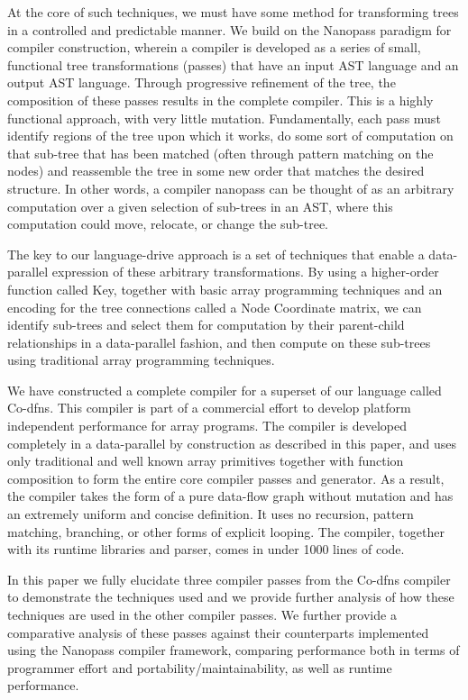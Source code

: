 \documentclass[pldi]{sigplanconf-pldi15}
\begin{document}
At the core of such techniques, we must have some method for transforming trees in a controlled and 
predictable manner. We build on the Nanopass paradigm for compiler construction, wherein a compiler is 
developed as a series of small, functional tree transformations (passes) that have an input AST language 
and an output AST language. Through progressive refinement of the tree, the composition of these 
passes results in the complete compiler. This is a highly functional approach, with very little mutation. 
Fundamentally, each pass must identify regions of the tree upon which it works, do some sort of computation 
on that sub-tree that has been matched (often through pattern matching on the nodes) and reassemble 
the tree in some new order that matches the desired structure. In other words, a compiler nanopass 
can be thought of as an arbitrary computation over a given selection of sub-trees in an AST, where 
this computation could move, relocate, or change the sub-tree. 

The key to our language-drive approach is a set of techniques that enable a data-parallel expression of 
these arbitrary transformations. By using a higher-order function called Key, together with basic array 
programming techniques and an encoding for the tree connections called a Node Coordinate matrix, we can 
identify sub-trees and select them for computation by their parent-child relationships in a data-parallel 
fashion, and then compute on these sub-trees using traditional array programming techniques. 

We have constructed a complete compiler for a superset of our language called Co-dfns. This compiler is 
part of a commercial effort to develop platform independent performance for array programs. The 
compiler is developed completely in a data-parallel by construction as described in this paper, and uses 
only traditional and well known array primitives together with function composition to form the entire 
core compiler passes and generator. As a result, the compiler takes the form of a pure data-flow graph 
without mutation and has an extremely uniform and concise definition. It uses no recursion, pattern 
matching, branching, or other forms of explicit looping. The compiler, together with its runtime libraries 
and parser, comes in under 1000 lines of code. 

In this paper we fully elucidate three compiler passes from the Co-dfns compiler to demonstrate the 
techniques used and we provide further analysis of how these techniques are used in the other compiler 
passes. We further provide a comparative analysis of these passes against their counterparts implemented 
using the Nanopass compiler framework, comparing performance both in terms of programmer effort and 
portability/maintainability, as well as runtime performance. 
\end{document}
